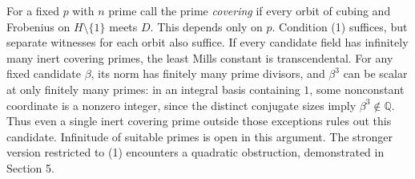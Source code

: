 \documentclass[11pt,a4paper,oneside,openany]{book}
\newcommand{\Q}{\mathbb Q}\newcommand{\C}{\mathbb C}\newcommand{\Z}{\mathbb Z}\newcommand{\F}{\mathbb F}\newcommand{\Tr}{\operatorname{Tr}}\newcommand{\Nm}{\operatorname{N}}\newcommand{\ord}{\operatorname{ord}}\newcommand{\K}{K}\newcommand{\OO}{\mathcal O_K}\newcommand{\unit}{\mathcal U}
\begin{document}
For a fixed $p$ with $n$ prime call the prime \emph{covering} if every orbit of cubing and Frobenius on $H\setminus\{1\}$ meets $D$. This depends only on $p$. Condition (1) suffices, but separate witnesses for each orbit also suffice. If every candidate field has infinitely many inert covering primes, the least Mills constant is transcendental. For any fixed candidate $\beta$, its norm has finitely many prime divisors, and $\beta^3$ can be scalar at only finitely many primes: in an integral basis containing $1$, some nonconstant coordinate is a nonzero integer, since the distinct conjugate sizes imply $\beta^3\notin\Q$. Thus even a single inert covering prime outside those exceptions rules out this candidate. Infinitude of suitable primes is open in this argument. The stronger version restricted to (1) encounters a quadratic obstruction, demonstrated in Section 5.
\end{document}
